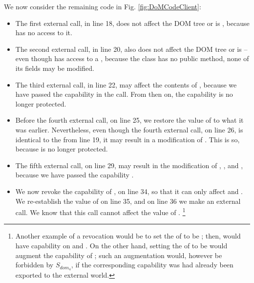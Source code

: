 We now consider the remaining code in Fig. \ref{fig:DoMCodeClient}:

\begin{itemize}
\item 
The first external call, in line 18, does not affect the DOM tree or is , because  has no access to it.
 \item 
The second external call, in line 20, also does not affect the DOM tree or is  -- even though  has access to a , because the class has no public method, none of its fields may be modified. 
 \item 
The third external call, in line 22, may affect the contents of , because we have passed the capability  in the call. 
From then on, the capability is no longer protected.
 \item 
Before the fourth external call, on line 25, we restore the value of  to what it was earlier. Nevertheless, even though the fourth external call, on 
line 26, is identical to the from line 19, it may result in a modification of . This is so, because  is no longer protected.
 \item 
The fifth external call, on line 29, may result in the modification of , , and , because we have passed the capability .
 \item 
We now revoke the capability of , on line 34, so that it can only affect  and . We re-establish the value of  on line 35, and on line 36 we make an external call. We know that this call cannot affect the value of .
\footnote{Another example of a revocation would be to set the    of  to be ; then,  
would have capability on  and .
On the other hand, setting the  of   to be  would augment the capability of ;
such an augmentation would, however be forbidden by $S_{dom_4}$, if the corresponding capability was had already been exported to the external world.}
\end{itemize}



